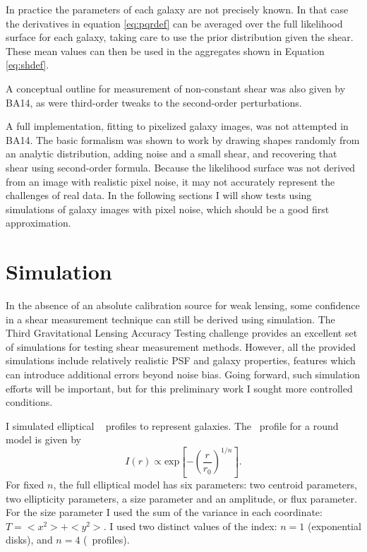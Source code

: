 \documentclass[usegraphicx,usenatbib]{mn2e}
\begin{document}
In practice the parameters of each galaxy are not precisely known. In that case
the derivatives in equation \ref{eq:pqrdef} can be averaged over the full
likelihood surface for each galaxy, taking care to use the prior
distribution given the shear.  These mean values can then be used in the
aggregates shown in Equation \ref{eq:shdef}.

A conceptual outline for measurement of non-constant shear was also given by
BA14, as were third-order tweaks to the second-order perturbations.

A full implementation, fitting to pixelized galaxy images, was not attempted in
BA14.  The basic formalism was shown to work by drawing shapes randomly from an
analytic distribution, adding noise and a small shear, and recovering that
shear using second-order formula.  Because the likelihood surface was not
derived from an image with realistic pixel noise, it may not accurately
represent the challenges of real data.  In the following sections I will show
tests using simulations of galaxy images with pixel noise, which should be a
good first approximation.

\section{Simulation} \label{sec:sim}

In the absence of an absolute calibration source for weak lensing, some
confidence in a shear measurement technique can still be derived using
simulation.  The Third Gravitational Lensing Accuracy Testing challenge
\citep[GREAT3,][]{great3} provides an excellent set of simulations for testing
shear measurement methods.  However, all the provided simulations include
relatively realistic PSF and galaxy properties, features which can introduce
additional errors beyond noise bias.  Going forward, such simulation efforts
will be important, but for this preliminary work I sought more controlled
conditions.

I simulated elliptical \sersic\ \citep{Sersic63} profiles to represent galaxies.
The \sersic\ profile for a round model is given by
\begin{equation}
I(r) \propto \mathrm{exp} \left[ -\left( \frac{r}{r_0} \right)^{1/n} \right].
\end{equation}
For fixed $n$, the full elliptical model has six parameters: two centroid
parameters, two ellipticity parameters, a size parameter and an amplitude, or
flux parameter.  For the size parameter I used the sum of the variance in each
coordinate: $T=<x^2> + <y^2>$.  I used two distinct values of the index: $n=1$
(exponential disks), and $n=4$ (\devauc\ profiles).  
\end{document}
